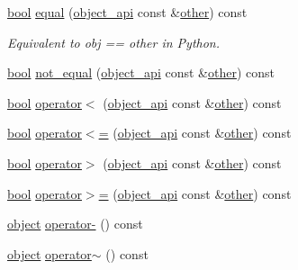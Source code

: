 \begin{DoxyCompactItemize}
\mbox{\hyperlink{asdl_8h_af6a258d8f3ee5206d682d799316314b1}{bool}} \mbox{\hyperlink{classobject__api_ae1d3648ad3568f13a4e9f28556bb6e99}{equal}} (\mbox{\hyperlink{classobject__api}{object\+\_\+api}} const \&\mbox{\hyperlink{dictobject_8h_abd4733e17e86acb453bda62bc8b96adf}{other}}) const
\begin{DoxyCompactList}\small\item\em Equivalent to obj == other in Python. \end{DoxyCompactList}\item 
\mbox{\hyperlink{asdl_8h_af6a258d8f3ee5206d682d799316314b1}{bool}} \mbox{\hyperlink{classobject__api_acd277a1d6dea84b197d78925b523133c}{not\+\_\+equal}} (\mbox{\hyperlink{classobject__api}{object\+\_\+api}} const \&\mbox{\hyperlink{dictobject_8h_abd4733e17e86acb453bda62bc8b96adf}{other}}) const
\item 
\mbox{\hyperlink{asdl_8h_af6a258d8f3ee5206d682d799316314b1}{bool}} \mbox{\hyperlink{classobject__api_a31c5855f0468b7e83584997a9ccb48bf}{operator$<$}} (\mbox{\hyperlink{classobject__api}{object\+\_\+api}} const \&\mbox{\hyperlink{dictobject_8h_abd4733e17e86acb453bda62bc8b96adf}{other}}) const
\item 
\mbox{\hyperlink{asdl_8h_af6a258d8f3ee5206d682d799316314b1}{bool}} \mbox{\hyperlink{classobject__api_a04fe4d81ee95c83ba2eb0f25220b9881}{operator$<$=}} (\mbox{\hyperlink{classobject__api}{object\+\_\+api}} const \&\mbox{\hyperlink{dictobject_8h_abd4733e17e86acb453bda62bc8b96adf}{other}}) const
\item 
\mbox{\hyperlink{asdl_8h_af6a258d8f3ee5206d682d799316314b1}{bool}} \mbox{\hyperlink{classobject__api_ac99465e3bdd49159c9964ba927f63a19}{operator$>$}} (\mbox{\hyperlink{classobject__api}{object\+\_\+api}} const \&\mbox{\hyperlink{dictobject_8h_abd4733e17e86acb453bda62bc8b96adf}{other}}) const
\item 
\mbox{\hyperlink{asdl_8h_af6a258d8f3ee5206d682d799316314b1}{bool}} \mbox{\hyperlink{classobject__api_a774f6938db60a302a924c140a8b2b2db}{operator$>$=}} (\mbox{\hyperlink{classobject__api}{object\+\_\+api}} const \&\mbox{\hyperlink{dictobject_8h_abd4733e17e86acb453bda62bc8b96adf}{other}}) const
\item 
\mbox{\hyperlink{classobject}{object}} \mbox{\hyperlink{classobject__api_a7a3fb2cd069528bbd6fc27191644e825}{operator-\/}} () const
\item 
\mbox{\hyperlink{classobject}{object}} \mbox{\hyperlink{classobject__api_a94189a6ba2cc0b6d6d37c15ab687020c}{operator$\sim$}} () const
\item 

\end{DoxyCompactItemize}
